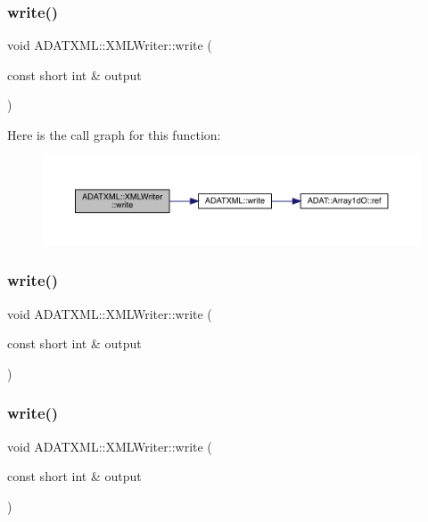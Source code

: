 \subsubsection{\texorpdfstring{write()}{write()}\hspace{0.1cm}{\footnotesize\ttfamily [10/30]}}
{\footnotesize\ttfamily void A\+D\+A\+T\+X\+M\+L\+::\+X\+M\+L\+Writer\+::write (\begin{DoxyParamCaption}\item[{const short int \&}]{output }\end{DoxyParamCaption})}

Here is the call graph for this function\+:
\nopagebreak
\begin{figure}[H]
\begin{center}
\leavevmode
\includegraphics[width=350pt]{da/da7/classADATXML_1_1XMLWriter_ab29dc20acb63a2ac633b35cc03e6e58f_cgraph}
\end{center}
\end{figure}
\mbox{\label{classADATXML_1_1XMLWriter_ab29dc20acb63a2ac633b35cc03e6e58f}} 
\subsubsection{\texorpdfstring{write()}{write()}\hspace{0.1cm}{\footnotesize\ttfamily [11/30]}}
{\footnotesize\ttfamily void A\+D\+A\+T\+X\+M\+L\+::\+X\+M\+L\+Writer\+::write (\begin{DoxyParamCaption}\item[{const short int \&}]{output }\end{DoxyParamCaption})}

\mbox{\label{classADATXML_1_1XMLWriter_ab29dc20acb63a2ac633b35cc03e6e58f}} 
\subsubsection{\texorpdfstring{write()}{write()}\hspace{0.1cm}{\footnotesize\ttfamily [12/30]}}
{\footnotesize\ttfamily void A\+D\+A\+T\+X\+M\+L\+::\+X\+M\+L\+Writer\+::write (\begin{DoxyParamCaption}\item[{const short int \&}]{output }\end{DoxyParamCaption})}

